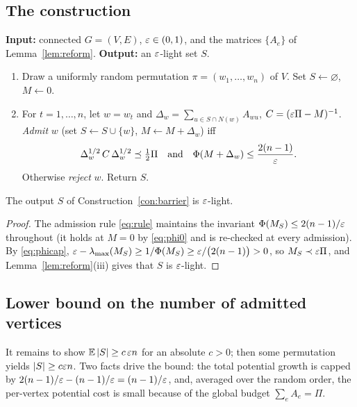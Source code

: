 \subsection{The construction}

\begin{construction}\label{con:barrier}
\textbf{Input:} connected $G=(V,E)$, $\varepsilon\in(0,1)$, and the matrices $\{A_e\}$ of
Lemma~\ref{lem:reform}. \textbf{Output:} an $\varepsilon$-light set $S$.
\begin{enumerate}[label=\textup{\arabic*.}]
\item Draw a uniformly random permutation $\pi=(w_1,\dots,w_n)$ of $V$. Set $S\leftarrow\varnothing$,
$M\leftarrow 0$.
\item For $t=1,\dots,n$, let $w=w_t$ and $\Delta_w=\sum_{u\in S\cap N(w)}A_{wu}$, $C=(\varepsilon\Pi-M)^{-1}$.
\emph{Admit} $w$ (set $S\leftarrow S\cup\{w\}$, $M\leftarrow M+\Delta_w$) iff
\begin{equation}\label{eq:rule}
\Delta_w^{1/2}\,C\,\Delta_w^{1/2}\preceq\tfrac12\Pi
\quad\text{and}\quad
\Phi(M+\Delta_w)\le\frac{2(n-1)}{\varepsilon}.
\end{equation}
Otherwise \emph{reject} $w$. Return $S$.
\end{enumerate}
\end{construction}

\begin{lemma}[Validity]\label{lem:valid}
The output $S$ of Construction~\ref{con:barrier} is $\varepsilon$-light.
\end{lemma}
\begin{proof}
The admission rule \eqref{eq:rule} maintains the invariant $\Phi(M_S)\le 2(n-1)/\varepsilon$ throughout
(it holds at $M=0$ by \eqref{eq:phi0} and is re-checked at every admission). By \eqref{eq:phicap},
$\varepsilon-\operatorname*{\lambda_{\max}}(M_S)\ge 1/\Phi(M_S)\ge \varepsilon/\big(2(n-1)\big)>0$, so $M_S\prec\varepsilon\Pi$, and
Lemma~\ref{lem:reform}(iii) gives that $S$ is $\varepsilon$-light.
\end{proof}

\subsection{Lower bound on the number of admitted vertices}

It remains to show $\mathbb E\,|S|\ge c\,\varepsilon n$ for an absolute $c>0$; then some permutation yields
$|S|\ge c\varepsilon n$. Two facts drive the bound: the total potential growth is capped by
$2(n-1)/\varepsilon-(n-1)/\varepsilon=(n-1)/\varepsilon$, and, averaged over the random order, the per-vertex potential
cost is small because of the global budget $\sum_{e}A_e=\Pi$.

